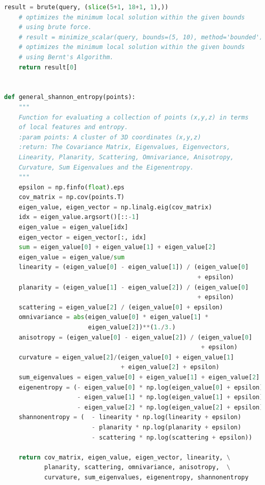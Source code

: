 \documentclass[%
]{USN-MSc}
\begin{document}
\begin{lstlisting}[language=Python, caption=Methods implemented in code, label={lst:Methods}]
    result = brute(query, (slice(5+1, 18+1, 1),))  
    # optimizes the minimum local solution within the given bounds  
    # using brute force.
    # result = minimize_scalar(query, bounds=(5, 10), method='bounded')  
    # optimizes the minimum local solution within the given bounds  
    # using Bernt's Algorithm.
    return result[0]


def general_shannon_entropy(points):
    """
    Function for evaluating a collection of points (x,y,z) in terms
    of local features and entropy.
    :param points: A cluster of 3D coordinates (x,y,z)
    :return: The Covariance Matrix, Eigenvalues, Eigenvectors,
    Linearity, Planarity, Scattering, Omnivariance, Anisotropy,
    Curvature, Sum Eigenvalues and the Eigenentropy.
    """
    epsilon = np.finfo(float).eps
    cov_matrix = np.cov(points.T)
    eigen_value, eigen_vector = np.linalg.eig(cov_matrix)
    idx = eigen_value.argsort()[::-1]
    eigen_value = eigen_value[idx]
    eigen_vector = eigen_vector[:, idx]
    sum = eigen_value[0] + eigen_value[1] + eigen_value[2]
    eigen_value = eigen_value/sum
    linearity = (eigen_value[0] - eigen_value[1]) / (eigen_value[0] 
                                                     + epsilon)
    planarity = (eigen_value[1] - eigen_value[2]) / (eigen_value[0] 
                                                     + epsilon)
    scattering = eigen_value[2] / (eigen_value[0] + epsilon)
    omnivariance = abs(eigen_value[0] * eigen_value[1] * 
                       eigen_value[2])**(1./3.)
    anisotropy = (eigen_value[0] - eigen_value[2]) / (eigen_value[0] 
                                                      + epsilon)
    curvature = eigen_value[2]/(eigen_value[0] + eigen_value[1] 
                                + eigen_value[2] + epsilon)
    sum_eigenvalues = eigen_value[0] + eigen_value[1] + eigen_value[2]
    eigenentropy = (- eigen_value[0] * np.log(eigen_value[0] + epsilon)
                    - eigen_value[1] * np.log(eigen_value[1] + epsilon)
                    - eigen_value[2] * np.log(eigen_value[2] + epsilon))
    shannonentropy = (  - linearity * np.log(linearity + epsilon)
                        - planarity * np.log(planarity + epsilon)
                        - scattering * np.log(scattering + epsilon))

    return cov_matrix, eigen_value, eigen_vector, linearity, \
           planarity, scattering, omnivariance, anisotropy,  \
           curvature, sum_eigenvalues, eigenentropy, shannonentropy
\end{lstlisting}
\end{document}
